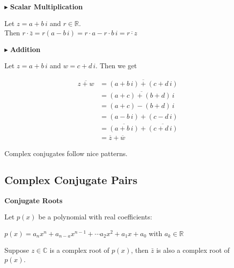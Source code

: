 \documentclass{ximera}
\begin{document}
$\blacktriangleright$ \textbf{Scalar Multiplication}


Let $z = a + b \, i$  and $r \in \mathbb{R}$. \\

Then $r \cdot \bar{z} = r(a - b \, i) = r \cdot a - r \cdot b \, i = \overline{r \cdot z}$







$\blacktriangleright$ \textbf{Addition}


Let $z = a + b \, i$ and $w = c + d \, i$.  Then we get


\begin{align*}
\overline{z + w} & = \overline{(a + b \, i) + (c + d \, i)}  \\
                & = \overline{(a + c) + (b + d) \, i}   \\
                & = (a + c) - (b + d) \, i  \\
                & = (a - b \, i) + (c - d \, i)   \\
                & = \overline{(a + b \, i)} + \overline{(c + d \, i)}  \\
                & = \overline{z} + \overline{w}
\end{align*}





Complex conjugates follow nice patterns. 

















\subsection*{Complex Conjugate Pairs}




\begin{theorem} \textbf{\textcolor{-red!75!green}{Conjugate Roots}}   



Let $p(x)$ be a polynomial with real coefficients:

$p(x) = a_n x^n + a_{n-a} x^{n-1} + \cdots a_2 x^2 + a_1 x + a_0$   with $a_k \in \mathbb{R}$

Suppose $z \in \mathbb{C}$ is a complex root of $p(x)$, then $\bar{z}$ is also a complex root of $p(x)$.


\end{theorem}
\end{document}
